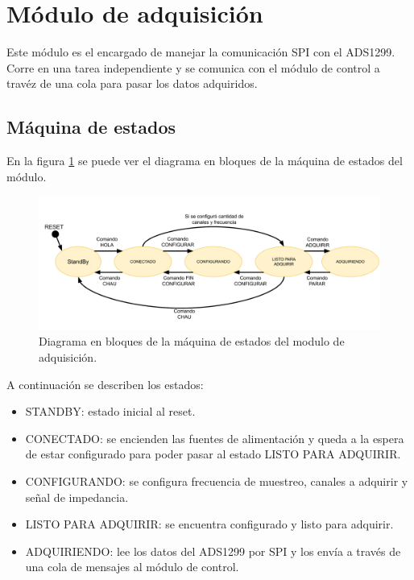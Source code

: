 \newpage
\section{Módulo de adquisición}
Este módulo es el encargado de manejar la comunicación SPI con el ADS1299. Corre en una tarea independiente y se comunica con el módulo de control a travéz de una cola para pasar los datos adquiridos.


\subsection{Máquina de estados}

En la figura \ref{fig:DiagramaEstados} se puede ver el diagrama en bloques de la máquina de estados del módulo.

\vspace{1cm}
\begin{figure}[htbp]
	\centering
	\includegraphics[width=1\textwidth]{./Figures/MEFads1299.pdf}
	\caption{Diagrama en bloques de la máquina de estados del modulo de adquisición.}
	\label{fig:DiagramaEstados}
\end{figure}
\vspace{1cm}

A continuación se describen los estados:
\begin{itemize}
\item STANDBY: estado inicial al reset.
\item CONECTADO: se encienden las fuentes de alimentación y queda a la espera de estar configurado para poder pasar al estado LISTO PARA ADQUIRIR.
\item CONFIGURANDO: se configura frecuencia de muestreo, canales a adquirir y señal de impedancia.
\item LISTO PARA ADQUIRIR: se encuentra configurado y listo para adquirir.
\item ADQUIRIENDO: lee los datos del ADS1299 por SPI y los envía a través de una cola de mensajes al módulo de control.
\end{itemize}

